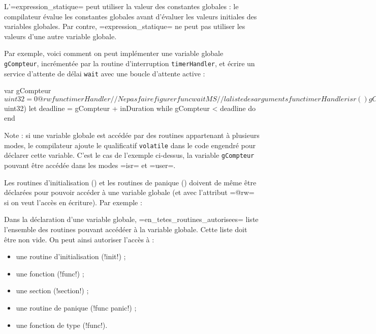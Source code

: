 L'\plm=expression_statique= peut utiliser la valeur des constantes globales : le compilateur évalue les constantes globales avant d'évaluer les valeurs initiales des variables globales. Par contre, \plm=expression_statique= ne peut pas utiliser les valeurs d'une autre variable globale.

Par exemple, voici comment on peut implémenter une variable globale \texttt{gCompteur}, incrémentée par la routine d'interruption \texttt{timerHandler}, et écrire un service d'attente de délai \texttt{wait} avec une boucle d'attente active :

\begin{PLM}
var gCompteur $uint32 = 0 {
  @rw func timerHandler // Ne pas faire figurer
  func waitMS           // la liste des arguments
}

func timerHandler isr () {
  gCompteur +%
}

func wait user (?inDuration $uint32) {
  let deadline = gCompteur + inDuration
  while gCompteur < deadline do
  end
}
\end{PLM}

Note : si une variable globale est accédée par des routines appartenant à plusieurs modes, le compilateur ajoute le qualificatif \texttt{volatile} dans le code engendré pour déclarer cette variable. C'est le cas de l'exemple ci-dessus, la variable \texttt{gCompteur} pouvant être accédée dans les modes \plm=isr= et \plm=user=.


Les routines d'initialisation () et les routines de panique ()
 doivent de même être déclarées pour pouvoir accéder à une variable globale (et avec l'attribut \plm=@rw= si on veut l'accès en écriture). Par exemple :



Dans la déclaration d'une variable globale, \plm=en_tetes_routines_autorisees= liste l'ensemble des routines pouvant accédéer à la variable globale. Cette liste doit être non vide. On peut ainsi autoriser l'accès à :
\begin{itemize}
  \item une routine d'initialisation (\plm!init!) ;
  \item une fonction (\plm!func!) ;
  \item une section (\plm!section!) ;
  \item une routine de panique (\plm!func panic!) ;
  \item une fonction de type (\plm!func!).
\end{itemize}

